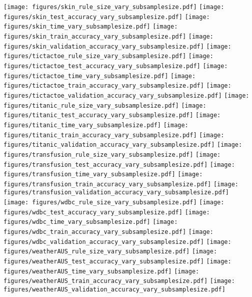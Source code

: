 	\begin{figure*}
	\texttt{[image: figures/skin\_rule\_size\_vary\_subsamplesize.pdf]}
	\texttt{[image: figures/skin\_test\_accuracy\_vary\_subsamplesize.pdf]}
	\texttt{[image: figures/skin\_time\_vary\_subsamplesize.pdf]}
	\texttt{[image: figures/skin\_train\_accuracy\_vary\_subsamplesize.pdf]}
	\texttt{[image: figures/skin\_validation\_accuracy\_vary\_subsamplesize.pdf]}
	\texttt{[image: figures/tictactoe\_rule\_size\_vary\_subsamplesize.pdf]}
	\texttt{[image: figures/tictactoe\_test\_accuracy\_vary\_subsamplesize.pdf]}
	\texttt{[image: figures/tictactoe\_time\_vary\_subsamplesize.pdf]}
	\texttt{[image: figures/tictactoe\_train\_accuracy\_vary\_subsamplesize.pdf]}
	\texttt{[image: figures/tictactoe\_validation\_accuracy\_vary\_subsamplesize.pdf]}
	\texttt{[image: figures/titanic\_rule\_size\_vary\_subsamplesize.pdf]}
	\texttt{[image: figures/titanic\_test\_accuracy\_vary\_subsamplesize.pdf]}
	\texttt{[image: figures/titanic\_time\_vary\_subsamplesize.pdf]}
	\texttt{[image: figures/titanic\_train\_accuracy\_vary\_subsamplesize.pdf]}
	\texttt{[image: figures/titanic\_validation\_accuracy\_vary\_subsamplesize.pdf]}
	\texttt{[image: figures/transfusion\_rule\_size\_vary\_subsamplesize.pdf]}
	\texttt{[image: figures/transfusion\_test\_accuracy\_vary\_subsamplesize.pdf]}
	\texttt{[image: figures/transfusion\_time\_vary\_subsamplesize.pdf]}
	\texttt{[image: figures/transfusion\_train\_accuracy\_vary\_subsamplesize.pdf]}
	\texttt{[image: figures/transfusion\_validation\_accuracy\_vary\_subsamplesize.pdf]}
	\texttt{[image: figures/wdbc\_rule\_size\_vary\_subsamplesize.pdf]}
	\texttt{[image: figures/wdbc\_test\_accuracy\_vary\_subsamplesize.pdf]}
	\texttt{[image: figures/wdbc\_time\_vary\_subsamplesize.pdf]}
	\texttt{[image: figures/wdbc\_train\_accuracy\_vary\_subsamplesize.pdf]}
	\texttt{[image: figures/wdbc\_validation\_accuracy\_vary\_subsamplesize.pdf]}
	\texttt{[image: figures/weatherAUS\_rule\_size\_vary\_subsamplesize.pdf]}
	\texttt{[image: figures/weatherAUS\_test\_accuracy\_vary\_subsamplesize.pdf]}
	\texttt{[image: figures/weatherAUS\_time\_vary\_subsamplesize.pdf]}
	\texttt{[image: figures/weatherAUS\_train\_accuracy\_vary\_subsamplesize.pdf]}
	\texttt{[image: figures/weatherAUS\_validation\_accuracy\_vary\_subsamplesize.pdf]}
\end{figure*}